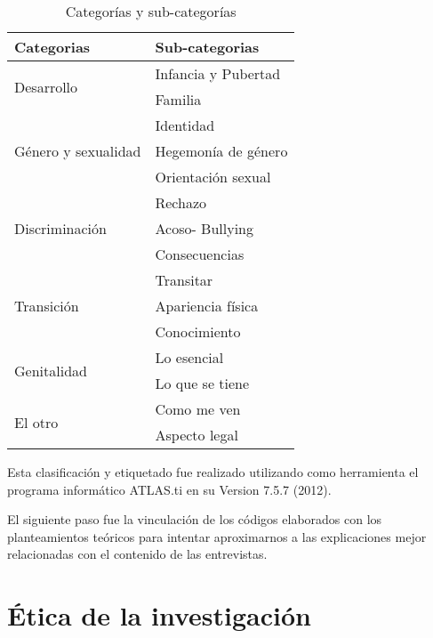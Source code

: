 \begin{table}[h]
\centering
\caption{Categorías y sub-categorías}
\label{tab:categorias}
\begin{tabularx}{\textwidth}{@{}XX@{}}
\toprule
Categorias                           & Sub-categorias      \\ \midrule
\multirow{2}{*}{Desarrollo}          & Infancia y Pubertad \\
                                     & Familia             \\ \midrule
\multirow{3}{*}{Género y sexualidad} & Identidad           \\
                                     & Hegemonía de género \\
                                     & Orientación sexual  \\ \midrule
\multirow{3}{*}{Discriminación}      & Rechazo             \\
                                     & Acoso- Bullying     \\
                                     & Consecuencias       \\ \midrule
\multirow{3}{*}{Transición}          & Transitar           \\
                                     & Apariencia física   \\
                                     & Conocimiento        \\ \midrule
\multirow{2}{*}{Genitalidad}         & Lo esencial         \\
                                     & Lo que se tiene     \\ \midrule
\multirow{2}{*}{El otro}             & Como me ven         \\
                                     & Aspecto legal       \\ \bottomrule
\end{tabularx}
\end{table}

Esta clasificación y etiquetado fue realizado utilizando como herramienta el
programa informático ATLAS.ti en su Version 7.5.7 (2012).

El siguiente paso fue la vinculación de los códigos elaborados con los
planteamientos teóricos para intentar aproximarnos a las explicaciones mejor
relacionadas con el contenido de las entrevistas.

\section{Ética de la investigación}

